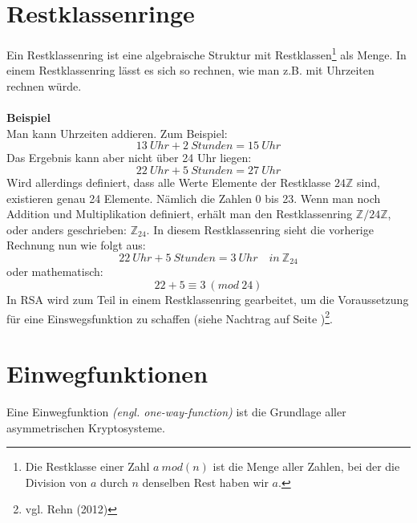 \section{Restklassenringe}
\label{sec:Restklassenringe}
Ein Restklassenring ist eine algebraische Struktur mit Restklassen\footnote{Die Restklasse einer Zahl $a~mod(n)$ ist die Menge aller Zahlen, bei der die Division von $a$ durch $n$ denselben Rest haben wir $a$.} als Menge.
In einem Restklassenring lässt es sich so rechnen, wie man z.B. mit Uhrzeiten rechnen würde.\\
\\
\textbf{Beispiel}\\
Man kann Uhrzeiten addieren. Zum Beispiel:
\begin{equation*}
13~Uhr + 2~Stunden = 15~Uhr
\end{equation*}
Das Ergebnis kann aber nicht über 24 Uhr liegen:
\begin{equation*}
22~Uhr + 5~Stunden = 27~Uhr
\end{equation*}
Wird allerdings definiert, dass alle Werte Elemente der Restklasse $24\mathbb{Z}$ sind, existieren genau 24 Elemente. Nämlich die Zahlen 0 bis 23. Wenn man noch Addition und Multiplikation definiert, erhält man den Restklassenring $\mathbb{Z}/24\mathbb{Z}$, oder anders geschrieben: $\mathbb{Z}_{24}$.
In diesem Restklassenring sieht die vorherige Rechnung nun wie folgt aus:
\begin{equation*}
22~Uhr + 5~Stunden = 3~Uhr\quad in~\mathbb{Z}_{24}
\end{equation*}
oder mathematisch:
\begin{equation*}
22+5 \equiv 3~(mod~24)
\end{equation*}
In RSA wird zum Teil in einem Restklassenring gearbeitet, um die Voraussetzung für eine Einswegsfunktion zu schaffen (siehe Nachtrag auf Seite \pageref{sec:Nachtrag})\footnote{vgl. Rehn (2012)}.
\section{Einwegfunktionen}
\label{sec:Einwegfunktionen}
Eine Einwegfunktion \textit{(engl. one-way-function)} ist die Grundlage aller asymmetrischen Kryptosysteme.


